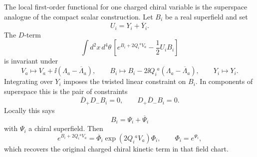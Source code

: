 The local first-order functional for one charged chiral variable is the
superspace analogue of the compact scalar construction.  Let \(B_i\) be a
real superfield and set
\begin{equation}
  U_i=Y_i+\overline Y_i .
  \label{eq:glsm-mirror-real-dual-coordinate}
\end{equation}
The \(D\)-term
\begin{equation}
  \int d^2x\,d^4\theta\,
  \left[
    e^{B_i+2Q_i{}^aV_a}
    -
    \frac12 U_iB_i
  \right]
  \label{eq:glsm-charged-chiral-first-order-dterm}
\end{equation}
is invariant under
\[
  V_a\mapsto V_a+\ii(\Lambda_a-\overline\Lambda_a),
  \qquad
  B_i\mapsto
  B_i-2\ii Q_i{}^a(\Lambda_a-\overline\Lambda_a),
  \qquad
  Y_i\mapsto Y_i .
\]
Integrating over \(Y_i\) imposes the twisted linear constraint on \(B_i\).
In components of superspace this is the pair of constraints
\[
  \overline D_+D_-B_i=0,\qquad D_+\overline D_-B_i=0 .
\]
Locally this says
\[
  B_i=\Psi_i+\overline\Psi_i
\]
with \(\Psi_i\) a chiral superfield.  Then
\[
  e^{B_i+2Q_i{}^aV_a}
  =
  \overline\Phi_i
  \exp(2Q_i{}^aV_a)\Phi_i,
  \qquad
  \Phi_i=e^{\Psi_i},
\]
which recovers the original charged chiral kinetic term in that field chart.

